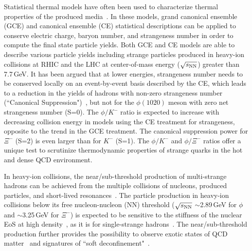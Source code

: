 \documentclass[aps,tightenlines,superscriptaddress,twocolumn]{revtex4-1}
\begin{document}
Statistical thermal models have often been used to characterize thermal properties of the produced media~\cite{Rafelski_1980279,Cleymans:1992zc,Braun-Munzinger:1994ewq,Becattini:1997ii,Braun-Munzinger:1999hun,Florkowski:2001fp,Braun-Munzinger:2001hwo,BraunMunzinger:2003zd,Redlich_CE:2004,Rafelski_PRC:2010,Andronic_2018Naure}. In these models, grand canonical ensemble (GCE) and canonical ensemble (CE) statistical descriptions can be applied to conserve electric charge, baryon number, and strangeness number in order to compute the final state particle yields. Both GCE and CE models are able to describe various particle yields including strange particles produced in heavy-ion collisions at RHIC and the LHC at center-of-mass energy ($\sqrt{s_{\rm NN}}$) greater than 7.7\,GeV. It has been argued that at lower energies, strangeness number needs to be conserved locally on an event-by-event basis described by the CE, which leads to a reduction in the yields of hadrons with non-zero strangeness number (``Canonical Suppression")~\cite{Rafelski_1980279,Redlich:2001kb,Rafelski_2002}, but not for the $\phi(1020)$ meson with zero net strangeness number (S=0). The $\phi/K^-$ ratio is expected to increase with decreasing collision energy in models using the CE treatment for strangeness, opposite to the trend in the GCE treatment. The canonical suppression power for $\Xi^-$ (S=2) is even larger than for $K^-$ (S=1). The $\phi/K^-$ and $\phi/\Xi^-$ ratios offer a unique test to scrutinize thermodynamic properties of strange quarks in the hot and dense QCD environment.


In heavy-ion collisions, the near/sub-threshold production of multi-strange hadrons can be achieved from the multiple collisions of nucleons, produced particles, and short-lived resonances~\cite{ZEEB2004297}. The particle production in heavy-ion collisions below its free nucleon-nucleon (NN) threshold ($\sqrt{s_{\rm NN}}$ $\sim$2.89\,GeV for $\phi$ and $\sim$3.25\,GeV for $\Xi^-$) is expected to be sensitive to the stiffness of the nuclear EoS at high density~\cite{yong2021double}, as it is for single-strange hadrons~\cite{KO.PhysRevLett.55.2661:1985,FUCHS20061_kaons:2006}. The near/sub-threshold production further provides the possibility
to observe exotic states of QCD matter~\cite{McLerran:2007qj} and signatures of ``soft deconfinement"~\cite{Fukushima:2020cmk}.
 
\end{document}
